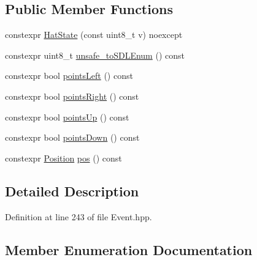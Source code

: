 \subsection*{Public Member Functions}
\begin{DoxyCompactItemize}
\item 
constexpr \mbox{\hyperlink{structrolmodl_1_1button__state_1_1_hat_state_ac9bc5d2d1c01e4d6fefe918f9cd51fbf}{Hat\+State}} (const uint8\+\_\+t v) noexcept
\item 
constexpr uint8\+\_\+t \mbox{\hyperlink{structrolmodl_1_1button__state_1_1_hat_state_ae44c78d5306ad94e123f8c51e4fbe0bb}{unsafe\+\_\+to\+S\+D\+L\+Enum}} () const
\item 
constexpr bool \mbox{\hyperlink{structrolmodl_1_1button__state_1_1_hat_state_a4d2a68da58955c2621d4666513b760a2}{points\+Left}} () const
\item 
constexpr bool \mbox{\hyperlink{structrolmodl_1_1button__state_1_1_hat_state_a2a034afba81e685a127b199844b0d3d3}{points\+Right}} () const
\item 
constexpr bool \mbox{\hyperlink{structrolmodl_1_1button__state_1_1_hat_state_aa466ab32a13115576d9cfd6f90154763}{points\+Up}} () const
\item 
constexpr bool \mbox{\hyperlink{structrolmodl_1_1button__state_1_1_hat_state_a13c84cc688aa5ccc59f782f192c0b941}{points\+Down}} () const
\item 
constexpr \mbox{\hyperlink{structrolmodl_1_1button__state_1_1_hat_state_ae56167e0c2bf1733215310a36461821e}{Position}} \mbox{\hyperlink{structrolmodl_1_1button__state_1_1_hat_state_aa7f0bc9150b625accb325f34b7018cda}{pos}} () const
\end{DoxyCompactItemize}


\subsection{Detailed Description}


Definition at line 243 of file Event.\+hpp.



\subsection{Member Enumeration Documentation}
\mbox{\label{structrolmodl_1_1button__state_1_1_hat_state_ae56167e0c2bf1733215310a36461821e}} 
